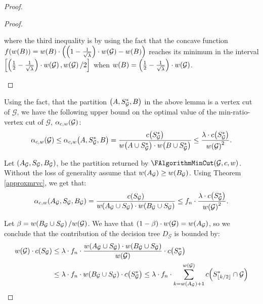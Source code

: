 \begin{theorem}
\begin{proof}
\begin{lemma}
\begin{proof}
\begin{enumerate}
                
                where the third inequality is by using the fact that the concave function $f\mathopen{}\left( w\mathopen{}\left( B \right) \right)=w\mathopen{}\left( B \right)\cdot\mathopen{}\left( \mathopen{}\left( 1-\frac{1}{\sqrt{\lambda}} \right)\cdot w\mathopen{}\left( \mathcal{G} \right)-w\mathopen{}\left( B \right) \right)$ reaches its minimum in the interval $\left[\mathopen{}\left( \frac{1}{2}-\frac{1}{\sqrt{\lambda}} \right)\cdot w\mathopen{}\left( \mathcal{G} \right),w\mathopen{}\left( \mathcal{G} \right)/2\right]$ when $w\mathopen{}\left( B \right)=\mathopen{}\left( \frac{1}{2}-\frac{1}{\sqrt{\lambda}} \right)\cdot w\mathopen{}\left( \mathcal{G} \right)$.
                \end{enumerate}
            \end{proof}
        \end{lemma}

        
        Using the fact, that the partition $\mathopen{}\left( A,S_{\mathcal{G}}^*,B \right)$ in the above lemma is a vertex cut of $\mathcal{G}$, we have the following upper bound on the optimal value of the min-ratio-vertex cut of $\mathcal{G}$,  $\alpha_{c,w}\mathopen{}\left( \mathcal{G} \right)$:
                $$\alpha_{c,w}\mathopen{}\left( \mathcal{G} \right)\leq \alpha_{c,w}\mathopen{}\left( A,S_{\mathcal{G}}^*,B \right)=\frac{c\mathopen{}\left( S_{\mathcal{G}}^* \right)}{w\mathopen{}\left( A\cup S_{\mathcal{G}}^* \right)\cdot w\mathopen{}\left( B\cup S_{\mathcal{G}}^* \right)}\leq \frac{\lambda\cdot c\mathopen{}\left( S_{\mathcal{G}}^* \right)}{w\mathopen{}\left( \mathcal{G} \right)^2}.
                $$
                
        Let $\mathopen{}\left( A_{\mathcal{G}},S_{\mathcal{G}}, B_{\mathcal{G}} \right)$, be the partition returned by $\FAlgorithmMinCut \br{\mathcal{G},c,w}$. Without the loss of generality assume that $w\mathopen{}\left( A_{\mathcal{G}} \right)\geq w\mathopen{}\left( B_{\mathcal{G}} \right)$. Using Theorem \ref{approxmrvc}, we get that:
        $$
        \alpha_{c,w}\mathopen{}\left( A_{\mathcal{G}},S_{\mathcal{G}}, B_{\mathcal{G}} \right)=\frac{c\mathopen{}\left( S_{\mathcal{G}} \right)}{w\mathopen{}\left( A_{\mathcal{G}}\cup S_{\mathcal{G}} \right)\cdot w\mathopen{}\left( B_{\mathcal{G}}\cup S_{\mathcal{G}} \right)}\leq f_n \cdot \frac{\lambda\cdot c\mathopen{}\left( S_{\mathcal{G}}^* \right)} {w\mathopen{}\left( \mathcal{G} \right)^2}.
        $$
        
        Let $\beta=w\mathopen{}\left( B_{\mathcal{G}}\cup S_{\mathcal{G}} \right)/w\mathopen{}\left( \mathcal{G} \right)$. We have that $\mathopen{}\left( 1-\beta \right)\cdot w\mathopen{}\left( \mathcal{G} \right) = w\mathopen{}\left( A_\mathcal{G} \right)$, so we conclude that the contribution of the decision tree $D_{\mathcal{G}}$ is bounded by:
        \begin{align*}
        w\mathopen{}\left( \mathcal{G} \right)\cdot c\mathopen{}\left( S_{\mathcal{G}} \right) &\leq \lambda \cdot f_n\cdot \frac{w\mathopen{}\left( A_{\mathcal{G}}\cup S_{\mathcal{G}} \right)\cdot w\mathopen{}\left( B_{\mathcal{G}}\cup S_{\mathcal{G}} \right)}{w\mathopen{}\left( \mathcal{G} \right)}\cdot c\mathopen{}\left( S_{\mathcal{G}}^* \right)\\
        & \leq 
        \lambda \cdot f_n\cdot w\mathopen{}\left( B_{\mathcal{G}}\cup S_{\mathcal{G}} \right)\cdot c\mathopen{}\left( S_{\mathcal{G}}^* \right) \leq 
        \lambda \cdot f_n\cdot \sum_{k=w\mathopen{}\left( A_{\mathcal{G}} \right)+1}^{w\mathopen{}\left( \mathcal{G} \right)}c\mathopen{}\left( S_{\mathopen{}\left\lfloor k/2 \right\rfloor}^*\cap \mathcal{G} \right)
        \end{align*}


\end{proof}
\end{theorem}
